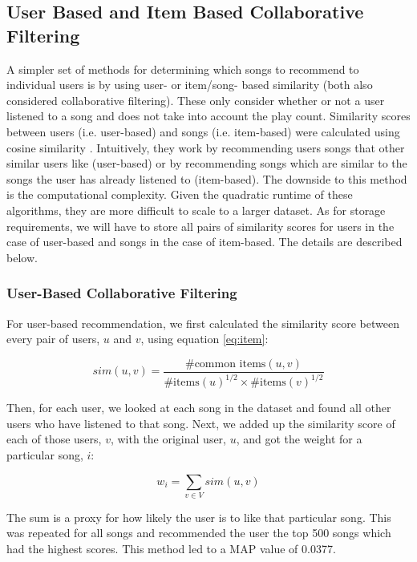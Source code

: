 \documentclass[11pt,preprint]{aastex}
\begin{document}
\subsection{User Based and Item Based Collaborative Filtering}
A simpler set of methods for determining which songs to recommend to individual users is by using user- or item/song- based similarity (both also considered collaborative filtering). These only consider whether or not a user listened to a song and does not take into account the play count. Similarity scores between users (i.e. user-based) and songs (i.e. item-based) were calculated using cosine similarity \citep{aiolli2013preliminary, li2012million}. Intuitively, they work by recommending users songs that other similar users like (user-based) or by recommending songs which are similar to the songs the user has already listened to (item-based). The downside to this method is the computational complexity. Given the quadratic runtime of these algorithms, they are more difficult to scale to a larger dataset. As for storage requirements, we will have to store all pairs of similarity scores for users in the case of user-based and songs in the case of item-based. The details are described below.

\subsubsection{User-Based Collaborative Filtering}
For user-based recommendation, we first calculated the similarity score between every pair of users, $u$ and $v$, using equation \ref{eq:item}:

\begin{equation}
sim(u,v) = \frac{\text{\# common items}(u, v)}{{\text{\# items}(u)}^{1/2} \times {\text{\# items}(v)}^{1/2}}
\label{eq:item}
\end{equation}

Then, for each user, we looked at each song in the dataset and found all other users who have listened to that song. Next, we added up the similarity score of each of those users, $v$, with the original user, $u$, and got the weight for a particular song, $i$:  

$$w_i = \sum_{v \in V} sim(u, v)$$

The sum is a proxy for how likely the user is to like that particular song. This was repeated for all songs and recommended the user the top 500 songs which had the highest scores. This method led to a MAP value of 0.0377.
\end{document}
